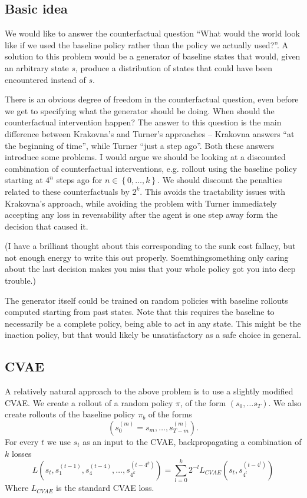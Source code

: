 \documentclass{article}
\begin{document}
	\subsection{Basic idea}
	 We would like to answer the counterfactual question ``What would the world look like if we used
		the baseline policy rather than the policy we actually used?''.
	 A solution to this problem would be a generator of baseline states that would,
		given an arbitrary state $s$, produce a distribution of states that could have
		been encountered instead of $s$.

		There is an obvious degree of freedom in the counterfactual question,
		even before we get to specifying what the generator should be doing.
		When should the counterfactual intervention happen? The answer to this
		question is the main difference between Krakovna's and Turner's approaches
		-- Krakovna answers ``at the beginning of time'', while Turner ``just a step ago''.
		Both these answers introduce some problems. I would argue we should be looking at
		a discounted combination of counterfactual interventions, e.g. rollout using the baseline
		policy starting at $4^n$ steps ago for $n \in \left\{ 0, \dots, k \right\}$.
		We should discount the penalties related to these counterfactuals by $2^k$.
		This avoids the tractability issues with Krakovna's approach, while avoiding the problem
		with Turner immediately accepting any loss in reversability after the agent is one step away
		form the decision that caused it.

		(I have a brilliant thought about this corresponding to the sunk cost fallacy, but
		not enough energy to write this out properly. Soemthingsomething
		only caring about the last decision makes you miss that your whole policy got you
		into deep trouble.)

		The generator itself could be trained on random policies with baseline rollouts
		computed starting from past states. Note that this requires the baseline to
		necessarily be a complete policy, being able to act in any state. This might
		be the inaction policy, but that would likely be unsatisfactory as a safe choice
		in general.
	\subsection{CVAE}
		A relatively natural approach to the above problem is to use a slightly modified CVAE.
		We create a rollout of a random policy $\pi$, of the form $\left( s_0, \dots s_T \right)$.
		We also create rollouts of the baseline policy $\pi_b$ of the forms
		\begin{equation*}
			\left( s^{\left( m \right)}_0 = s_m, \dots, s^{\left( m \right)}_{T-m} \right).
		\end{equation*}
		For every $t$ we use $s_t$ as an input to the CVAE, backpropagating a combination of
		$k$ losses
		\begin{equation*}
			L(s_t, s^{\left( t-1 \right)}_{1}, s^{\left( t-4 \right)}_4, \dots, s^{\left( t-4^k \right)}_{4^k}) = \sum_{l = 0}^k 2^{-l}L_{CVAE}\left( s_t, s^{\left( t-4^l \right)}_{4^l} \right)
		\end{equation*}
		Where $L_{CVAE}$ is the standard CVAE loss.
\end{document}
